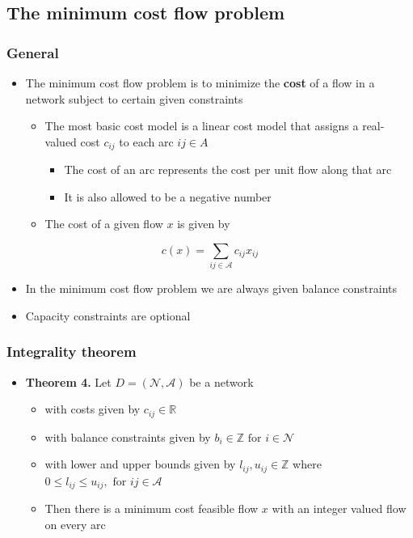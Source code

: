 \documentclass[11pt]{article}
\begin{document}
\subsection{The minimum cost flow problem}
\label{sec:org44f73f5}
\subsubsection{General}
\label{sec:org6eb6a42}
\begin{itemize}
\item The minimum cost flow problem is to minimize the \textbf{cost} of a flow in a network subject to certain given constraints
\begin{itemize}
\item The most basic cost model is a linear cost model that assigns a real-valued cost \(c_{ij}\) to each arc \(ij \in A\)
\begin{itemize}
\item The cost of an arc represents the cost per unit flow along that arc
\item It is also allowed to be a negative number
\end{itemize}
\item The cost of a given flow \(x\) is given by
\end{itemize}
\end{itemize}
\begin{equation}
 	c(x) = \sum_{ij \in \mathcal A} c_{ij}x_{ij} 
\end{equation}
\begin{itemize}
\item In the minimum cost flow problem we are always given balance constraints
\item Capacity constraints are optional
\end{itemize}

\subsubsection{Integrality theorem}
\label{sec:orgb5c7473}
\begin{itemize}
\item \textbf{Theorem 4.} Let \(D = (\mathcal N, \mathcal A)\) be a network 
\begin{itemize}
\item with costs given by \(c_{ij} \in \mathbb R\)
\item with balance constraints given by \(b_i \in \mathbb Z \text{ for } i \in \mathcal N\)
\item with lower and upper bounds given by \(l_{ij}, u_{ij} \in \mathbb Z\) where \(0 \leq l_{ij} \leq u_{ij}, \text{ for } ij \in \mathcal A\)
\item Then there is a minimum cost feasible flow \(x\) with an integer valued flow on every arc
\end{itemize}
\end{itemize}
\end{document}
